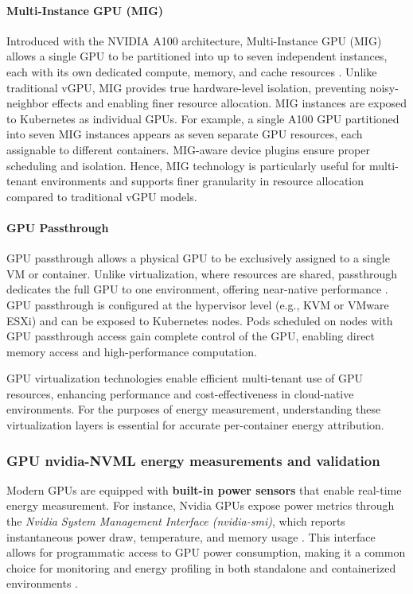 \paragraph{Multi-Instance GPU (MIG)}
Introduced with the NVIDIA A100 architecture, Multi-Instance GPU (MIG) allows a single GPU to be partitioned into up to seven independent instances, each with its own dedicated compute, memory, and cache resources \cite{nvidia_mig_user_guide}. Unlike traditional vGPU, MIG provides true hardware-level isolation, preventing noisy-neighbor effects and enabling finer resource allocation. MIG instances are exposed to Kubernetes as individual GPUs. For example, a single A100 GPU partitioned into seven MIG instances appears as seven separate GPU resources, each assignable to different containers. MIG-aware device plugins ensure proper scheduling and isolation. Hence, MIG technology is particularly useful for multi-tenant environments and supports finer granularity in resource allocation compared to traditional vGPU models.

\paragraph{GPU Passthrough}
GPU passthrough allows a physical GPU to be exclusively assigned to a single VM or container. Unlike virtualization, where resources are shared, passthrough dedicates the full GPU to one environment, offering near-native performance \cite{nvidia_passthrough}. GPU passthrough is configured at the hypervisor level (e.g., KVM or VMware ESXi) and can be exposed to Kubernetes nodes. Pods scheduled on nodes with GPU passthrough access gain complete control of the GPU, enabling direct memory access and high-performance computation.

GPU virtualization technologies enable efficient multi-tenant use of GPU resources, enhancing performance and cost-effectiveness in cloud-native environments. For the purposes of energy measurement, understanding these virtualization layers is essential for accurate per-container energy attribution.

\subsubsection{GPU nvidia-NVML energy measurements and validation}

Modern GPUs are equipped with \textbf{built-in power sensors} that enable real-time energy measurement. For instance, Nvidia GPUs expose power metrics through the \textit{Nvidia System Management Interface (nvidia-smi)}, which reports instantaneous power draw, temperature, and memory usage \cite{nvidia_smi_docs}. This interface allows for programmatic access to GPU power consumption, making it a common choice for monitoring and energy profiling in both standalone and containerized environments \cite{nvidia_mig_user_guide}.

